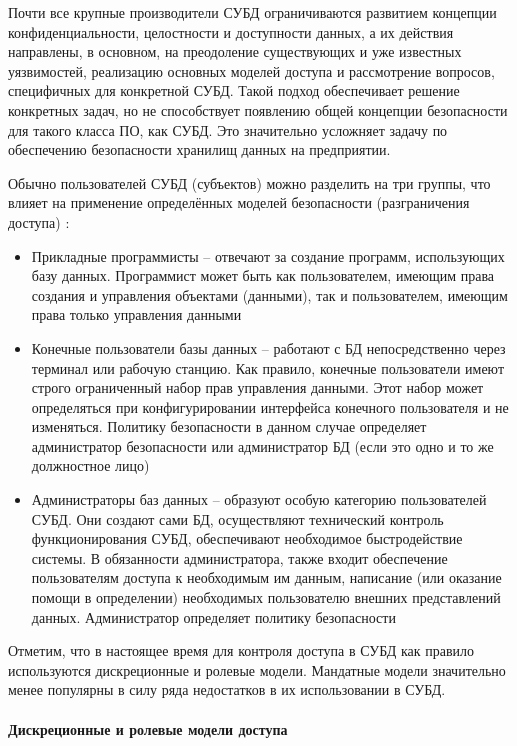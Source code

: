 {Почти все крупные производители СУБД ограничиваются развитием концепции конфиденциальности, целостности 
и доступности данных, а их действия направлены, в основном, на преодоление существующих и уже известных 
уязвимостей, реализацию основных моделей доступа и рассмотрение вопросов, специфичных для конкретной СУБД. 
Такой подход обеспечивает решение конкретных задач, но не способствует появлению общей концепции 
безопасности для такого класса ПО, как СУБД. Это значительно усложняет задачу по обеспечению безопасности 
хранилищ данных на предприятии.

Обычно пользователей СУБД (субъектов) можно разделить на три группы, что влияет на применение определённых 
моделей безопасности (разграничения доступа) \autocite{CitForumSafeDB}:
\begin{itemize}
    \item Прикладные программисты -- отвечают за создание программ, использующих базу данных. Программист 
    может быть как пользователем, имеющим права создания и управления объектами (данными), так и пользователем, 
    имеющим права только управления данными

    \item Конечные пользователи базы данных -- работают с БД непосредственно через терминал или рабочую станцию. 
    Как правило, конечные пользователи имеют строго ограниченный набор прав управления данными. Этот набор 
    может определяться при конфигурировании интерфейса конечного пользователя и не изменяться. Политику 
    безопасности в данном случае определяет администратор безопасности или администратор БД (если это одно и 
    то же должностное лицо)

    \item Администраторы баз данных -- образуют особую категорию пользователей СУБД. Они создают сами БД, 
    осуществляют технический контроль функционирования СУБД, обеспечивают необходимое быстродействие системы. 
    В обязанности администратора, также входит обеспечение пользователям доступа к необходимым им данным, 
    написание (или оказание помощи в определении) необходимых пользователю внешних представлений данных. 
    Администратор определяет политику безопасности
\end{itemize}

Отметим, что в настоящее время для контроля доступа в СУБД как правило используются дискреционные и ролевые 
модели. Мандатные модели значительно менее популярны в силу ряда недостатков в их использовании в СУБД.

\paragraph{Дискреционные и ролевые модели доступа}

}
